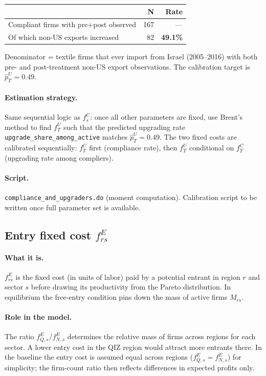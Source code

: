 \documentclass[12pt]{article}
\begin{document}
\begin{center}
\begin{tabular}{lrr}
\toprule
 & N & Rate \\
\midrule
Compliant firms with pre+post observed & 167 & --- \\
Of which non-US exports increased & 82 & \textbf{49.1\%} \\
\bottomrule
\end{tabular}
\end{center}

\noindent Denominator = textile firms that ever import from Israel (2005--2016)
with both pre- and post-treatment non-US export observations.
The calibration target is $\hat p^U_T = 0.49$.

\paragraph{Estimation strategy.}
Same sequential logic as $f^C_s$: once all other parameters are fixed,
use Brent's method to find $f^U_T$ such that the predicted upgrading rate
\texttt{upgrade\_share\_among\_active} matches $\hat p^U_T = 0.49$. The two
fixed costs are calibrated sequentially: $f^C_T$ first (compliance rate),
then $f^U_T$ conditional on $f^C_T$ (upgrading rate among compliers).

\paragraph{Script.} \texttt{compliance\_and\_upgraders.do} (moment computation).
Calibration script to be written once full parameter set is available.

\subsection{Entry fixed cost $f^E_{rs}$}

\paragraph{What it is.}
$f^E_{rs}$ is the fixed cost (in units of labor) paid by a potential entrant
in region $r$ and sector $s$ before drawing its productivity from the Pareto
distribution. In equilibrium the free-entry condition pins down the mass of
active firms $M_{rs}$.

\paragraph{Role in the model.}
The ratio $f^E_{Q,s}/f^E_{N,s}$ determines the relative mass of firms
across regions for each sector. A lower entry cost in the QIZ region would
attract more entrants there. In the baseline the entry cost is assumed equal
across regions ($f^E_{Q,s} = f^E_{N,s}$) for simplicity; the firm-count
ratio then reflects differences in expected profits only.
\end{document}
